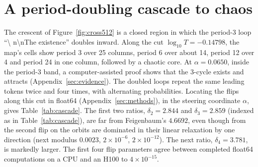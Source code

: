 \documentclass[11pt,letterpaper]{article}
\begin{document}
\section{A period-doubling cascade to chaos}
\label{sec:cascade}
The crescent of Figure~\ref{fig:cross512} is a closed region in which the period-3 loop ``\textbackslash
n\textbackslash nThe existence'' doubles inward. Along the cut $\log_{10}T=-0.14798$, the map's cells show period 3
over 25 columns, period 6 over about 14, period 12 over 4 and period 24 in one column, followed by a chaotic core. At
$\alpha=0.0650$, inside the period-3 band, a computer-assisted proof shows that the 3-cycle exists and attracts
(Appendix~\ref{sec:evidence}). The doubled loops repeat the same leading tokens twice and four times, with alternating probabilities. Locating the flips
along this cut in float64 (Appendix~\ref{sec:methods}), in the steering coordinate $\alpha$, gives
Table~\ref{tab:cascade}. The first two ratios, $\delta_2=2.844$ and $\delta_3=2.859$ (indexed as in
Table~\ref{tab:cascade}), are far from Feigenbaum's $4.6692$, even though from the second flip on the orbits are
dominated in their linear relaxation by one direction (next modulus $0.0023$, $2\times10^{-6}$, $2\times10^{-12}$). The next ratio,
$\delta_4=3.781$, is markedly larger. The first four flip parameters agree between completed float64 computations on a
CPU and an H100 to $4\times10^{-15}$.
\end{document}
